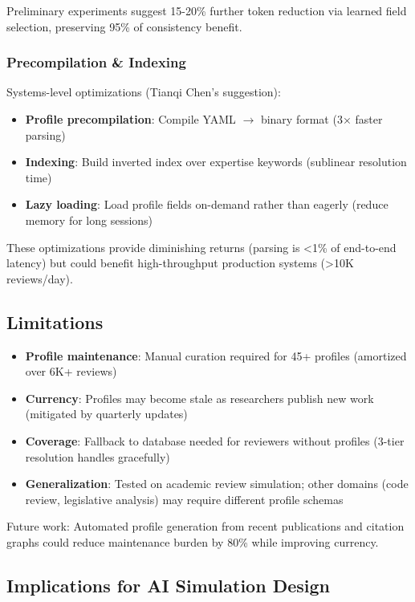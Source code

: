 Preliminary experiments suggest 15-20\% further token reduction via learned field selection, preserving 95\% of consistency benefit.

\subsubsection{Precompilation \& Indexing}

Systems-level optimizations (Tianqi Chen's suggestion):

\begin{itemize}
\item \textbf{Profile precompilation}: Compile YAML $\rightarrow$ binary format (3× faster parsing)
\item \textbf{Indexing}: Build inverted index over expertise keywords (sublinear resolution time)
\item \textbf{Lazy loading}: Load profile fields on-demand rather than eagerly (reduce memory for long sessions)
\end{itemize}

These optimizations provide diminishing returns (parsing is <1\% of end-to-end latency) but could benefit high-throughput production systems (>10K reviews/day).

\subsection{Limitations}

\begin{itemize}
\item \textbf{Profile maintenance}: Manual curation required for 45+ profiles (amortized over 6K+ reviews)
\item \textbf{Currency}: Profiles may become stale as researchers publish new work (mitigated by quarterly updates)
\item \textbf{Coverage}: Fallback to database needed for reviewers without profiles (3-tier resolution handles gracefully)
\item \textbf{Generalization}: Tested on academic review simulation; other domains (code review, legislative analysis) may require different profile schemas
\end{itemize}

Future work: Automated profile generation from recent publications and citation graphs could reduce maintenance burden by 80\% while improving currency.

\subsection{Implications for AI Simulation Design}

